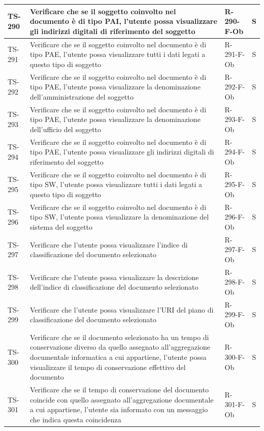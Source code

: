\documentclass[a4paper,12pt]{article}
\begin{document}
\begin{longtable}{|p{1.5cm}|p{8.3cm}|p{2.4cm}|c|}
\hline
TS-290 & Verificare che se il soggetto coinvolto nel documento è di tipo PAI, l'utente possa visualizzare gli indirizzi digitali di riferimento del soggetto & R-290-F-Ob & S \\
\hline
TS-291 & Verificare che se il soggetto coinvolto nel documento è di tipo PAE, l'utente possa visualizzare tutti i dati legati a questo tipo di soggetto & R-291-F-Ob & S \\
\hline
TS-292 & Verificare che se il soggetto coinvolto nel documento è di tipo PAE, l'utente possa visualizzare la denominazione dell'amministrazione del soggetto & R-292-F-Ob & S \\
\hline
TS-293 & Verificare che se il soggetto coinvolto nel documento è di tipo PAE, l'utente possa visualizzare la denominazione dell'ufficio del soggetto & R-293-F-Ob & S \\
\hline
TS-294 & Verificare che se il soggetto coinvolto nel documento è di tipo PAE, l'utente possa visualizzare gli indirizzi digitali di riferimento del soggetto & R-294-F-Ob & S \\
\hline
TS-295 & Verificare che se il soggetto coinvolto nel documento è di tipo SW, l'utente possa visualizzare tutti i dati legati a questo tipo di soggetto & R-295-F-Ob & S \\
\hline
TS-296 & Verificare che se il soggetto coinvolto nel documento è di tipo SW, l'utente possa visualizzare la denominazione del sistema del soggetto & R-296-F-Ob & S \\
\hline
TS-297 & Verificare che l'utente possa visualizzare l'indice di classificazione del documento selezionato & R-297-F-Ob & S \\
\hline
TS-298 & Verificare che l'utente possa visualizzare la descrizione dell'indice di classificazione del documento selezionato & R-298-F-Ob & S \\
\hline
TS-299 & Verificare che l'utente possa visualizzare l'URI del piano di classificazione del documento selezionato & R-299-F-Ob & S \\
\hline
TS-300 & Verificare che se il documento selezionato ha un tempo di conservazione diverso da quello assegnato all'aggregazione documentale informatica a cui appartiene, l'utente possa visualizzare il tempo di conservazione effettivo del documento & R-300-F-Ob  & S \\
\hline
TS-301 & Verificare che se il tempo di conservazione del documento coincide con quello assegnato all'aggregazione documentale a cui appartiene, l'utente sia informato con un messaggio che indica questa coincidenza & R-301-F-Ob & S \\

\end{longtable}
\end{document}
